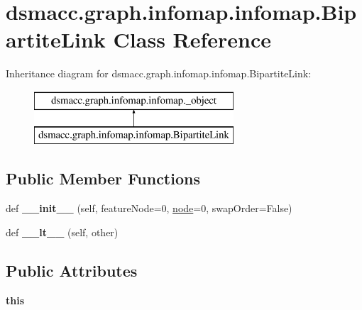 \hypertarget{classdsmacc_1_1graph_1_1infomap_1_1infomap_1_1BipartiteLink}{}\section{dsmacc.\+graph.\+infomap.\+infomap.\+Bipartite\+Link Class Reference}
\label{classdsmacc_1_1graph_1_1infomap_1_1infomap_1_1BipartiteLink}
Inheritance diagram for dsmacc.\+graph.\+infomap.\+infomap.\+Bipartite\+Link\+:\begin{figure}[H]
\begin{center}
\leavevmode
\includegraphics[height=2.000000cm]{classdsmacc_1_1graph_1_1infomap_1_1infomap_1_1BipartiteLink}
\end{center}
\end{figure}
\subsection*{Public Member Functions}
\begin{DoxyCompactItemize}
\item 
\mbox{\label{classdsmacc_1_1graph_1_1infomap_1_1infomap_1_1BipartiteLink_a2319768f9a3c873d2b670f5511f2cc51}} 
def {\bfseries \+\_\+\+\_\+init\+\_\+\+\_\+} (self, feature\+Node=0, \mbox{\hyperlink{structnode}{node}}=0, swap\+Order=False)
\item 
\mbox{\label{classdsmacc_1_1graph_1_1infomap_1_1infomap_1_1BipartiteLink_ac9d7f28278cff80d77e6b76987952d6e}} 
def {\bfseries \+\_\+\+\_\+lt\+\_\+\+\_\+} (self, other)
\end{DoxyCompactItemize}
\subsection*{Public Attributes}
\begin{DoxyCompactItemize}
\item 
\mbox{\label{classdsmacc_1_1graph_1_1infomap_1_1infomap_1_1BipartiteLink_a08988a525ea86b9f1f15153906bb68ef}} 
{\bfseries this}
\end{DoxyCompactItemize}
